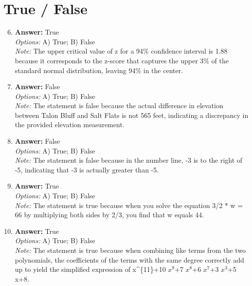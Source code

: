 \documentclass[12pt]{article}
\begin{document}
\section*{True / False}
\begin{enumerate}[label=\arabic*.]
\setcounter{enumi}{5}
\item \textbf{Answer:} True
\\ \textit{Options:} A) True; B) False
\\ \textit{Note:} The upper critical value of z for a 94\% confidence interval is 1.88 because it corresponds to the z-score that captures the upper 3\% of the standard normal distribution, leaving 94\% in the center.
\item \textbf{Answer:} False
\\ \textit{Options:} A) True; B) False
\\ \textit{Note:} The statement is false because the actual difference in elevation between Talon Bluff and Salt Flats is not 565 feet, indicating a discrepancy in the provided elevation measurement.
\item \textbf{Answer:} False
\\ \textit{Options:} A) True; B) False
\\ \textit{Note:} The statement is false because in the number line, -3 is to the right of -5, indicating that -3 is actually greater than -5.
\item \textbf{Answer:} True
\\ \textit{Options:} A) True; B) False
\\ \textit{Note:} The statement is true because when you solve the equation 3/2 * w = 66 by multiplying both sides by 2/3, you find that w equals 44.
\item \textbf{Answer:} True
\\ \textit{Options:} A) True; B) False
\\ \textit{Note:} The statement is true because when combining like terms from the two polynomials, the coefficients of the terms with the same degree correctly add up to yield the simplified expression of x^\{11\}+10 $x^9$+7 $x^8$+6 $x^7$+3 $x^3$+5 x+8.
\end{enumerate}
\end{document}
